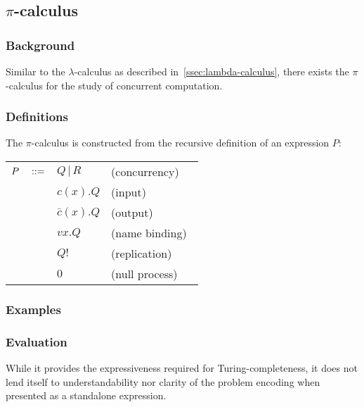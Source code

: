 \subsection{$\pi$-calculus}\label{subsec:pi-calculus}

    \subsubsection{Background}
        \cite{pi-calculus}
        Similar to the $\lambda$-calculus as described in~\ref{ssec:lambda-calculus}, there exists the $\pi$-calculus for the study of concurrent computation.


    \subsubsection{Definitions}
        The $\pi$-calculus is constructed from the recursive definition of an expression $P$:
        \begin{center} %
            \begin{tabular}{ l l l }
                $P \quad ::=$    & $Q \, | \, R$     & (concurrency) \\
                                    & $ c(x).Q$         & (input) \\
                                    & $\bar{c}(x).Q$    & (output) \\
                                    & $vx.Q$            & (name binding)~\footnotemark\\
                                    & $Q!$              & (replication)~\footnotemark\\
                                    & $0$               & (null process) \\
            \end{tabular}
        \end{center}
        \addtocounter{footnote}{-1}

    \subsubsection{Examples}


    \subsubsection{Evaluation}
        While it provides the expressiveness required for Turing-completeness, it does not lend itself to understandability nor clarity of the problem encoding when presented as a standalone expression.

